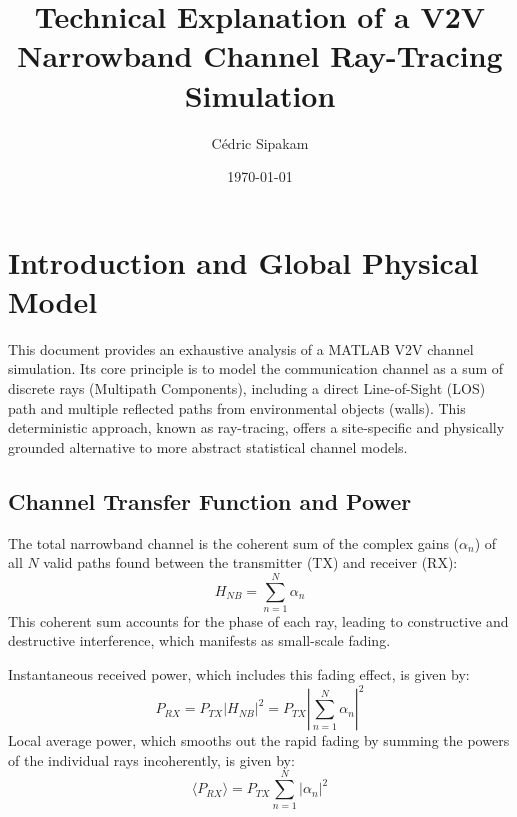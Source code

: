 \documentclass{article}
\title{Technical Explanation of a V2V Narrowband Channel Ray-Tracing Simulation}
\author{Cédric Sipakam}
\date{\today}
\begin{document}
	\maketitle
	\section{Introduction and Global Physical Model}
	This document provides an exhaustive analysis of a MATLAB V2V channel simulation. Its core principle is to model the communication channel as a sum of discrete rays (Multipath Components), including a direct Line-of-Sight (LOS) path and multiple reflected paths from environmental objects (walls). This deterministic approach, known as ray-tracing, offers a site-specific and physically grounded alternative to more abstract statistical channel models.
	
	\subsection{Channel Transfer Function and Power}
	The total narrowband channel is the coherent sum of the complex gains ($\alpha_n$) of all $N$ valid paths found between the transmitter (TX) and receiver (RX):
	\begin{equation}
		H_{NB} = \sum_{n=1}^{N} \alpha_n
	\end{equation}
	This coherent sum accounts for the phase of each ray, leading to constructive and destructive interference, which manifests as small-scale fading.
	
	Instantaneous received power, which includes this fading effect, is given by:
	\begin{equation}
		P_{RX} = P_{TX} |H_{NB}|^2 = P_{TX} \left| \sum_{n=1}^{N} \alpha_n \right|^2
	\end{equation}
	Local average power, which smooths out the rapid fading by summing the powers of the individual rays incoherently, is given by:
	\begin{equation}
		\langle P_{RX} \rangle = P_{TX} \sum_{n=1}^{N} |\alpha_n|^2
	\end{equation}
	
\end{document}
